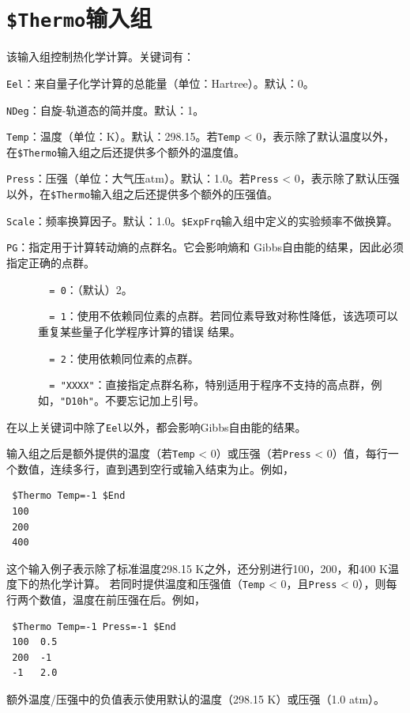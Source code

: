 \documentclass[12pt,a4paper,openany,twoside,cap]{ctexbook}
\begin{document}
\section{\texttt{\$Thermo}输入组} \label{sec:inp-thermo}

该输入组控制热化学计算。关键词有：

\bigskip{}
\verb|Eel|：来自量子化学计算的总能量（单位：Hartree）。默认：0。

\bigskip{}
\verb|NDeg|：自旋-轨道态的简并度。默认：1。

\bigskip{}
\verb|Temp|：温度（单位：K）。默认：298.15。若\verb|Temp| < 0，表示除了默认温度以外，在\texttt{\$Thermo}输入组之后还提供多个额外的温度值。

\bigskip{}
\verb|Press|：压强（单位：大气压atm）。默认：1.0。若\verb|Press| < 0，表示除了默认压强以外，在\texttt{\$Thermo}输入组之后还提供多个额外的压强值。

\bigskip{}
\verb|Scale|：频率换算因子。默认：1.0。\texttt{\$ExpFrq}输入组中定义的实验频率不做换算。

\bigskip{}
\verb|PG|：指定用于计算转动熵的点群名。它会影响熵和 Gibbs自由能的结果，因此必须指定正确的点群。
\begin{description}
\item[ ]\verb|  = 0|：（默认）2。
\item[ ]\verb|  = 1|：使用不依赖同位素的点群。若同位素导致对称性降低，该选项可以重复某些量子化学程序计算的错误 结果。
\item[ ]\verb|  = 2|：使用依赖同位素的点群。
\item[ ]\verb|  = "XXXX"|：直接指定点群名称，特别适用于程序不支持的高点群，例如，\verb|"D10h"|。不要忘记加上引号。
\end{description}

在以上关键词中除了\verb|Eel|以外，都会影响Gibbs自由能的结果。

输入组之后是额外提供的温度（若\verb|Temp| < 0）或压强（若\verb|Press| < 0）值，每行一个数值，连续多行，直到遇到空行或输入结束为止。例如，
\begin{colorboxed}[oval=false,boxcolor=green!75!black,bgcolor=green!5!white]
\ttfamily
\begin{lstlisting}
 $Thermo Temp=-1 $End
 100
 200
 400
\end{lstlisting}\end{colorboxed}
这个输入例子表示除了标准温度298.15 K之外，还分别进行100，200，和400 K温度下的热化学计算。
若同时提供温度和压强值（\verb|Temp| < 0，且\verb|Press| < 0），则每行两个数值，温度在前压强在后。例如，
\begin{colorboxed}[oval=false,boxcolor=green!75!black,bgcolor=green!5!white]
\ttfamily
\begin{lstlisting}
 $Thermo Temp=-1 Press=-1 $End
 100  0.5
 200  -1
 -1   2.0
\end{lstlisting}\end{colorboxed}
额外温度/压强中的负值表示使用默认的温度（298.15 K）或压强（1.0 atm）。
\end{document}
